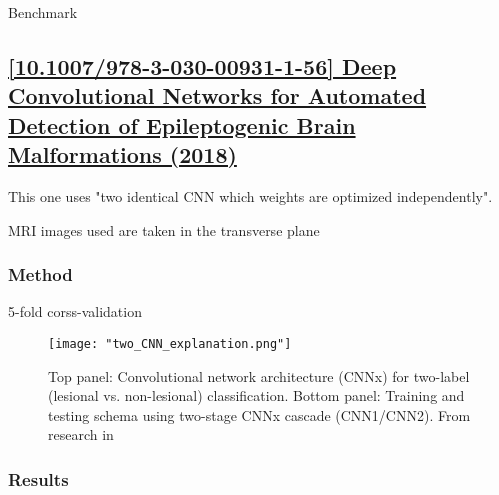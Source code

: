 \begin{table}[htbp]
	\centering
	\caption{Benchmark}

	\caption{Results from: }
	\label{tab:res4}
\end{table}

\newpage
\subsection{\href{https://link.springer.com/chapter/10.1007/978-3-030-00931-1_56}{[10.1007/978-3-030-00931-1-56] Deep Convolutional Networks for Automated Detection of Epileptogenic Brain Malformations (2018) }}
\label{res5}

This one uses "two identical CNN which weights are optimized independently".

MRI images used are taken in the transverse plane

\subsubsection{Method}

5-fold corss-validation

\begin{figure}[htbp]
	\centering
	\texttt{[image: "two\_CNN\_explanation.png"]}
	\caption{Top panel: Convolutional network architecture (CNNx) for two-label (lesional vs. non-lesional) classification. Bottom panel: Training and testing schema using two-stage CNNx cascade (CNN1/CNN2). From research in }
\end{figure}

\subsubsection{Results}

